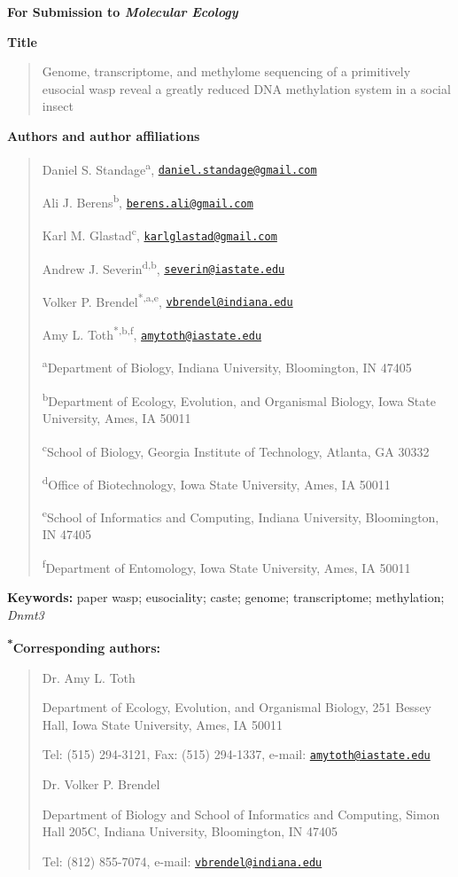 \documentclass[]{article}
\date{}
\begin{document}
\textbf{For Submission to \emph{Molecular Ecology}}

\textbf{Title }

\begin{quote}
Genome, transcriptome, and methylome sequencing of a primitively
eusocial wasp reveal a greatly reduced DNA methylation system in a
social insect
\end{quote}

\textbf{Authors and author affiliations}

\begin{quote}
Daniel S. Standage\textsuperscript{a},
\href{mailto:daniel.standage@gmail.com}{\nolinkurl{daniel.standage@gmail.com}}

Ali J. Berens\textsuperscript{b},
\href{mailto:berens.ali@gmail.com}{\nolinkurl{berens.ali@gmail.com}}

Karl M. Glastad\textsuperscript{c},
\href{mailto:karlglastad@gmail.com}{\nolinkurl{karlglastad@gmail.com}}

Andrew J. Severin\textsuperscript{d,b},
\href{mailto:severin@iastate.edu}{\nolinkurl{severin@iastate.edu}}

Volker P. Brendel\textsuperscript{*,a,e},
\href{mailto:vbrendel@indiana.edu}{\nolinkurl{vbrendel@indiana.edu}}

Amy L. Toth\textsuperscript{*,b,f},
\href{mailto:amytoth@iastate.edu}{\nolinkurl{amytoth@iastate.edu}}

\textsuperscript{a}Department of Biology, Indiana University,
Bloomington, IN 47405

\textsuperscript{b}Department of Ecology, Evolution, and Organismal
Biology, Iowa State University, Ames, IA 50011

\textsuperscript{c}School of Biology, Georgia Institute of Technology,
Atlanta, GA 30332

\textsuperscript{d}Office of Biotechnology, Iowa State University, Ames,
IA 50011

\textsuperscript{e}School of Informatics and Computing, Indiana
University, Bloomington, IN 47405

\textsuperscript{f}Department of Entomology, Iowa State University,
Ames, IA 50011
\end{quote}

\textbf{Keywords:} paper wasp; eusociality; caste; genome;
transcriptome; methylation; \emph{Dnmt3}

\textbf{\textsuperscript{*}Corresponding authors:}

\begin{quote}
Dr. Amy L. Toth

Department of Ecology, Evolution, and Organismal Biology, 251 Bessey
Hall, Iowa State University, Ames, IA 50011

Tel: (515) 294-3121, Fax: (515) 294-1337, e-mail:
\href{mailto:amytoth@iastate.edu}{\nolinkurl{amytoth@iastate.edu}}

Dr. Volker P. Brendel

Department of Biology and School of Informatics and Computing, Simon
Hall 205C, Indiana University, Bloomington, IN 47405

Tel: (812) 855-7074, e-mail:
\href{mailto:vbrendel@indiana.edu}{\nolinkurl{vbrendel@indiana.edu}}
\end{quote}
\end{document}
